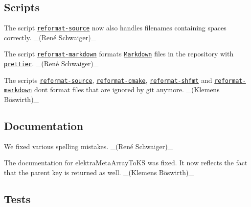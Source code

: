 \subsection*{Scripts}


\begin{DoxyItemize}
\item The script \href{https://master.libelektra.org/scripts/reformat-source}{\tt {\ttfamily reformat-\/source}} now also handles filenames containing spaces correctly. \+\_\+(René Schwaiger)\+\_\+
\item The script \href{https://master.libelektra.org/scripts/reformat-markdown}{\tt {\ttfamily reformat-\/markdown}} formats \href{https://daringfireball.net/projects/markdown}{\tt Markdown} files in the repository with \href{https://prettier.io}{\tt {\ttfamily prettier}}. \+\_\+(René Schwaiger)\+\_\+
\item The scripts \href{https://master.libelektra.org/scripts/reformat-source}{\tt {\ttfamily reformat-\/source}}, \href{https://master.libelektra.org/scripts/reformat-cmake}{\tt {\ttfamily reformat-\/cmake}}, \href{https://master.libelektra.org/scripts/reformat-shfmt}{\tt {\ttfamily reformat-\/shfmt}} and \href{https://master.libelektra.org/scripts/reformat-markdown}{\tt {\ttfamily reformat-\/markdown}} don\textquotesingle{}t format files that are ignored by git anymore. \+\_\+(Klemens Böswirth)\+\_\+
\end{DoxyItemize}

\subsection*{Documentation}


\begin{DoxyItemize}
\item We fixed various spelling mistakes. \+\_\+(René Schwaiger)\+\_\+
\item The documentation for {\ttfamily elektra\+Meta\+Array\+To\+KS} was fixed. It now reflects the fact that the parent key is returned as well. \+\_\+(Klemens Böswirth)\+\_\+
\end{DoxyItemize}

\subsection*{Tests}


